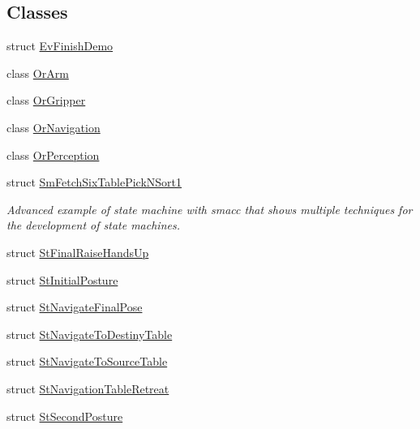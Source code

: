 \subsection*{Classes}
\begin{DoxyCompactItemize}
\item 
struct \hyperlink{structsm__moveit__screw__loop_1_1EvFinishDemo}{Ev\+Finish\+Demo}
\item 
class \hyperlink{classsm__moveit__screw__loop_1_1OrArm}{Or\+Arm}
\item 
class \hyperlink{classsm__moveit__screw__loop_1_1OrGripper}{Or\+Gripper}
\item 
class \hyperlink{classsm__moveit__screw__loop_1_1OrNavigation}{Or\+Navigation}
\item 
class \hyperlink{classsm__moveit__screw__loop_1_1OrPerception}{Or\+Perception}
\item 
struct \hyperlink{structsm__moveit__screw__loop_1_1SmFetchSixTablePickNSort1}{Sm\+Fetch\+Six\+Table\+Pick\+N\+Sort1}
\begin{DoxyCompactList}\small\item\em Advanced example of state machine with smacc that shows multiple techniques for the development of state machines. \end{DoxyCompactList}\item 
struct \hyperlink{structsm__moveit__screw__loop_1_1StFinalRaiseHandsUp}{St\+Final\+Raise\+Hands\+Up}
\item 
struct \hyperlink{structsm__moveit__screw__loop_1_1StInitialPosture}{St\+Initial\+Posture}
\item 
struct \hyperlink{structsm__moveit__screw__loop_1_1StNavigateFinalPose}{St\+Navigate\+Final\+Pose}
\item 
struct \hyperlink{structsm__moveit__screw__loop_1_1StNavigateToDestinyTable}{St\+Navigate\+To\+Destiny\+Table}
\item 
struct \hyperlink{structsm__moveit__screw__loop_1_1StNavigateToSourceTable}{St\+Navigate\+To\+Source\+Table}
\item 
struct \hyperlink{structsm__moveit__screw__loop_1_1StNavigationTableRetreat}{St\+Navigation\+Table\+Retreat}
\item 
struct \hyperlink{structsm__moveit__screw__loop_1_1StSecondPosture}{St\+Second\+Posture}
\end{DoxyCompactItemize}
